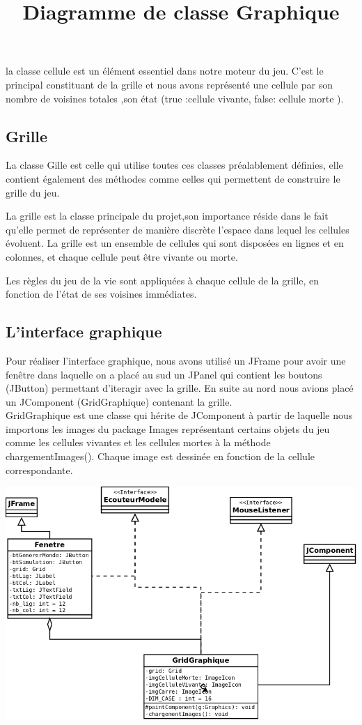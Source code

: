\documentclass[a4paper,12pt]{article} %
\begin{document}
la classe cellule est un élément essentiel dans notre moteur du jeu. C'est le principal constituant de la grille et nous avons représenté une cellule par son nombre de voisines totales ,son état (true :cellule vivante, false: cellule morte ).


\subsection{Grille}
La classe Gille est celle qui utilise toutes ces classes préalablement définies, elle contient également des méthodes comme celles qui permettent de construire le grille du jeu.

La grille est la classe principale du projet,son importance réside dans le fait qu'elle permet de représenter de manière discrète l'espace dans lequel les cellules évoluent. La grille est un ensemble de cellules qui sont disposées en lignes et en colonnes, et chaque cellule peut être vivante ou morte.

Les règles du jeu de la vie sont appliquées à chaque cellule de la grille, en fonction de l'état de ses voisines immédiates. 

\subsection{L’interface graphique}
			
Pour réaliser l’interface graphique, nous avons utilisé un JFrame pour avoir une fenêtre dans laquelle on a placé au sud un JPanel qui contient  les boutons (JButton) permettant d'iteragir avec la grille. En suite au nord nous avions placé un JComponent (GridGraphique) contenant la grille.\\

GridGraphique est une classe qui hérite de JComponent à partir de laquelle nous importons les images du package Images représentant certains objets du jeu comme les cellules vivantes et les cellules mortes à la méthode chargementImages(). Chaque image est dessinée en fonction de la cellule correspondante.

\begin{center}
\includegraphics[scale=0.4]{images/classeIhm.png}\\
\title{Diagramme de classe Graphique}	
\end{center}	
\end{document}

